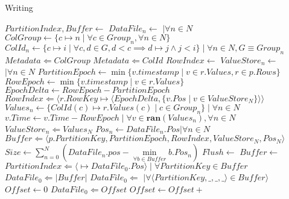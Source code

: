 \documentclass[fleqn]{article}
\begin{document}
\begin{algorithm}
\scriptsize
\caption{Writing}
\begin{algorithmic}[1]
\State $PartitionIndex, Buffer \gets $ 
\State $DataFile_{n} \gets $  $\mid \forall n \in N$
\Statex
\State $ColGroup \gets \{c \mapsto n \mid \forall c \in Group_{n}, \forall n \in N \}$
\State $ColId_{n} \gets \{c \mapsto i \mid \forall c, d \in G, d < c \implies d \mapsto j \wedge j < i \} \mid \forall n \in N, G \equiv Group_{n}$
\State $Metadata \Leftarrow ColGroup$
\State $Metadata \Leftarrow ColId$
\Statex
{} 
 \State $RowIndex \gets $ 
 \State $ValueStore_{n} \gets $  $ \mid \forall n \in N$
 \State $PartitionEpoch \gets \min \{v.timestamp \mid v \in r.Values, r \in p.Rows\}$
 \Statex
   \State $RowEpoch \gets \min \{v.timestamp \mid v \in r.Values\}$
   \State $EpochDelta \gets RowEpoch - PartitionEpoch$
   \State $RowIndex \Leftarrow \langle r.RowKey \mapsto \langle EpochDelta, \{ v.Pos \mid v \in ValueStore_{N} \}\rangle \rangle $ 
   \State $Values_{n} \gets \{ ColId(c) \mapsto r.Values(c) \mid c \in Group_{n} \} \mid \forall n \in N$
   \State $v.Time \gets v.Time - RowEpoch \mid \forall v \in \mathbf{ran}(Values_{n}), \forall n \in N$
   \State $ ValueStore_{n} \Leftarrow Values_{N} $
 \EndFor
\Statex
 \State $Pos_{n} \gets DataFile_{n}.Pos | \forall n \in N$
 \State $Buffer \Leftarrow \langle p.PartitionKey, PartitionEpoch, RowIndex, ValueStore_{N}, Pos_{N} \rangle$
 \State $Size \gets \sum\limits_{n=0}^{N} (DataFile_{n}.pos - \min\limits_{\forall b \in Buffer} b.Pos_{n}) $
   \State $Flush \gets$ 
   \State {}
   \State $Buffer \gets $ 
 \EndIf
\EndFor
\State {}
\EndProcedure
\Statex
{}
   \State $PartitionIndex \Leftarrow \langle $$ \mapsto DataFile_{0}.Pos \rangle \mid \forall PartitionKey \in Buffer$
   \State $DataFile_{0} \Leftarrow \lvert Buffer \rvert$
   \State $DataFile_{0} \Leftarrow $  $ \mid \forall \langle PartitionKey, \_,\_,\_\rangle \in Buffer \rangle$
   \State $Offset \gets 0$
     \State $DataFile_0 \Leftarrow Offset$
     \State $Offset \gets Offset + $ 

\end{algorithmic}
\end{algorithm}
\end{document}
